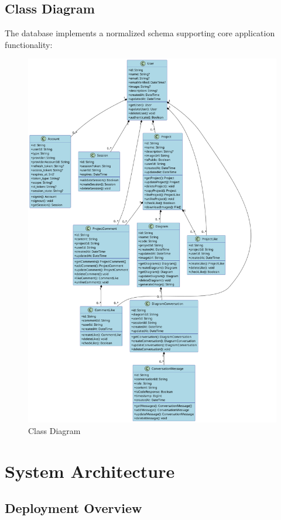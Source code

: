 \subsection{Class Diagram}

The database implements a normalized schema supporting core application functionality:

\begin{figure}[H]
  \centering
  \includegraphics[width=1
  \textwidth]{conception/SprintI/class_diagram2.png}
  \caption{Class Diagram}
  \label{fig:class_diagram}
\end{figure}
\section{System Architecture}

\subsection{Deployment Overview}

